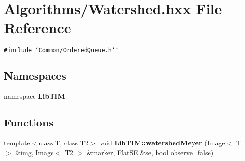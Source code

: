 \section{Algorithms/Watershed.hxx File Reference}
\label{Watershed_8hxx}
{\tt \#include \char`\"{}Common/Ordered\-Queue.h\char`\"{}}\par
\subsection*{Namespaces}
\begin{CompactItemize}
\item 
namespace {\bf Lib\-TIM}
\end{CompactItemize}
\subsection*{Functions}
\begin{CompactItemize}
\item 
template$<$class T, class T2$>$ void {\bf Lib\-TIM::watershed\-Meyer} (Image$<$ T $>$ \&img, Image$<$ T2 $>$ \&marker, Flat\-SE \&se, bool observe=false)
\end{CompactItemize}
